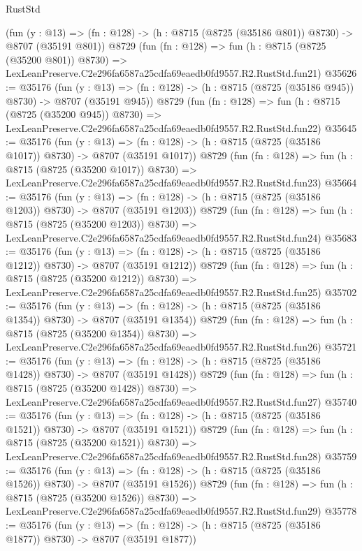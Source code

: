 \begin{lexlean}{RustStd}
\begin{coremodule}
    (fun (y : @13) => (fn : @128) -> (h : @8715 (@8725 (@35186 @801)) @8730) -> @8707 (@35191 @801))
    @8729
    (fun (fn : @128) =>
    fun (h : @8715 (@8725 (@35200 @801)) @8730) =>
    LexLeanPreserve.C2e296fa6587a25cdfa69eaedb0fd9557.R2.RustStd.fun21)
@35626 := @35176
    (fun (y : @13) => (fn : @128) -> (h : @8715 (@8725 (@35186 @945)) @8730) -> @8707 (@35191 @945))
    @8729
    (fun (fn : @128) =>
    fun (h : @8715 (@8725 (@35200 @945)) @8730) =>
    LexLeanPreserve.C2e296fa6587a25cdfa69eaedb0fd9557.R2.RustStd.fun22)
@35645 := @35176
    (fun (y : @13) =>
    (fn : @128) -> (h : @8715 (@8725 (@35186 @1017)) @8730) -> @8707 (@35191 @1017))
    @8729
    (fun (fn : @128) =>
    fun (h : @8715 (@8725 (@35200 @1017)) @8730) =>
    LexLeanPreserve.C2e296fa6587a25cdfa69eaedb0fd9557.R2.RustStd.fun23)
@35664 := @35176
    (fun (y : @13) =>
    (fn : @128) -> (h : @8715 (@8725 (@35186 @1203)) @8730) -> @8707 (@35191 @1203))
    @8729
    (fun (fn : @128) =>
    fun (h : @8715 (@8725 (@35200 @1203)) @8730) =>
    LexLeanPreserve.C2e296fa6587a25cdfa69eaedb0fd9557.R2.RustStd.fun24)
@35683 := @35176
    (fun (y : @13) =>
    (fn : @128) -> (h : @8715 (@8725 (@35186 @1212)) @8730) -> @8707 (@35191 @1212))
    @8729
    (fun (fn : @128) =>
    fun (h : @8715 (@8725 (@35200 @1212)) @8730) =>
    LexLeanPreserve.C2e296fa6587a25cdfa69eaedb0fd9557.R2.RustStd.fun25)
@35702 := @35176
    (fun (y : @13) =>
    (fn : @128) -> (h : @8715 (@8725 (@35186 @1354)) @8730) -> @8707 (@35191 @1354))
    @8729
    (fun (fn : @128) =>
    fun (h : @8715 (@8725 (@35200 @1354)) @8730) =>
    LexLeanPreserve.C2e296fa6587a25cdfa69eaedb0fd9557.R2.RustStd.fun26)
@35721 := @35176
    (fun (y : @13) =>
    (fn : @128) -> (h : @8715 (@8725 (@35186 @1428)) @8730) -> @8707 (@35191 @1428))
    @8729
    (fun (fn : @128) =>
    fun (h : @8715 (@8725 (@35200 @1428)) @8730) =>
    LexLeanPreserve.C2e296fa6587a25cdfa69eaedb0fd9557.R2.RustStd.fun27)
@35740 := @35176
    (fun (y : @13) =>
    (fn : @128) -> (h : @8715 (@8725 (@35186 @1521)) @8730) -> @8707 (@35191 @1521))
    @8729
    (fun (fn : @128) =>
    fun (h : @8715 (@8725 (@35200 @1521)) @8730) =>
    LexLeanPreserve.C2e296fa6587a25cdfa69eaedb0fd9557.R2.RustStd.fun28)
@35759 := @35176
    (fun (y : @13) =>
    (fn : @128) -> (h : @8715 (@8725 (@35186 @1526)) @8730) -> @8707 (@35191 @1526))
    @8729
    (fun (fn : @128) =>
    fun (h : @8715 (@8725 (@35200 @1526)) @8730) =>
    LexLeanPreserve.C2e296fa6587a25cdfa69eaedb0fd9557.R2.RustStd.fun29)
@35778 := @35176
    (fun (y : @13) =>
    (fn : @128) -> (h : @8715 (@8725 (@35186 @1877)) @8730) -> @8707 (@35191 @1877))

\end{coremodule}
\end{lexlean}
